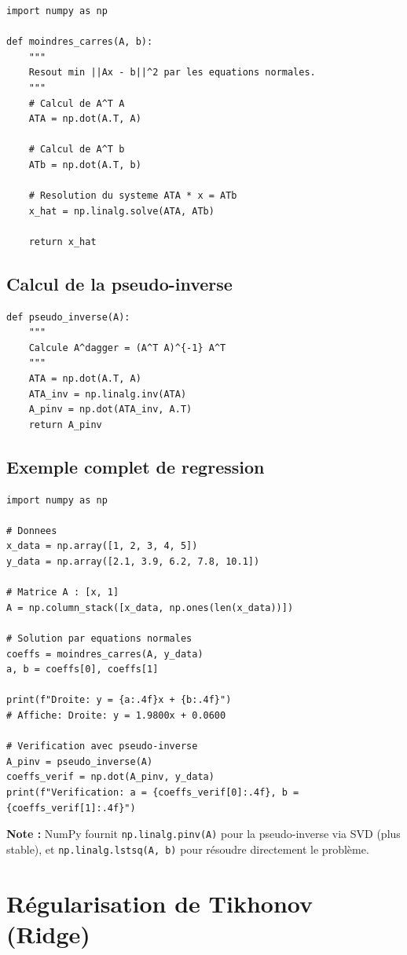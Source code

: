 \documentclass[12pt,a4paper]{article}
\begin{document}
\begin{lstlisting}
import numpy as np

def moindres_carres(A, b):
    """
    Resout min ||Ax - b||^2 par les equations normales.
    """
    # Calcul de A^T A
    ATA = np.dot(A.T, A)

    # Calcul de A^T b
    ATb = np.dot(A.T, b)

    # Resolution du systeme ATA * x = ATb
    x_hat = np.linalg.solve(ATA, ATb)

    return x_hat
\end{lstlisting}

\subsection{Calcul de la pseudo-inverse}

\begin{lstlisting}
def pseudo_inverse(A):
    """
    Calcule A^dagger = (A^T A)^{-1} A^T
    """
    ATA = np.dot(A.T, A)
    ATA_inv = np.linalg.inv(ATA)
    A_pinv = np.dot(ATA_inv, A.T)
    return A_pinv
\end{lstlisting}

\subsection{Exemple complet de regression}

\begin{lstlisting}
import numpy as np

# Donnees
x_data = np.array([1, 2, 3, 4, 5])
y_data = np.array([2.1, 3.9, 6.2, 7.8, 10.1])

# Matrice A : [x, 1]
A = np.column_stack([x_data, np.ones(len(x_data))])

# Solution par equations normales
coeffs = moindres_carres(A, y_data)
a, b = coeffs[0], coeffs[1]

print(f"Droite: y = {a:.4f}x + {b:.4f}")
# Affiche: Droite: y = 1.9800x + 0.0600

# Verification avec pseudo-inverse
A_pinv = pseudo_inverse(A)
coeffs_verif = np.dot(A_pinv, y_data)
print(f"Verification: a = {coeffs_verif[0]:.4f}, b = {coeffs_verif[1]:.4f}")
\end{lstlisting}

\textbf{Note :} NumPy fournit \texttt{np.linalg.pinv(A)} pour la pseudo-inverse via SVD (plus stable), et \texttt{np.linalg.lstsq(A, b)} pour résoudre directement le problème.

\newpage
\section{Régularisation de Tikhonov (Ridge)}
\end{document}

